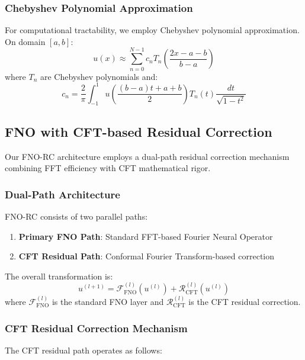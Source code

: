 \documentclass[11pt,twocolumn]{article}
\newcommand{\F}{\mathcal{F}}
\begin{document}
\subsubsection{Chebyshev Polynomial Approximation}

For computational tractability, we employ Chebyshev polynomial approximation. On domain $[a, b]$:
\begin{equation}
u(x) \approx \sum_{n=0}^{N-1} c_n T_n\left(\frac{2x - a - b}{b - a}\right)
\end{equation}
where $T_n$ are Chebyshev polynomials and:
\begin{equation}
c_n = \frac{2}{\pi} \int_{-1}^{1} u\left(\frac{(b-a)t + a + b}{2}\right) T_n(t) \frac{dt}{\sqrt{1-t^2}}
\end{equation}

\subsection{FNO with CFT-based Residual Correction}

Our FNO-RC architecture employs a dual-path residual correction mechanism combining FFT efficiency with CFT mathematical rigor.

\subsubsection{Dual-Path Architecture}

FNO-RC consists of two parallel paths:
\begin{enumerate}
    \item \textbf{Primary FNO Path}: Standard FFT-based Fourier Neural Operator
    \item \textbf{CFT Residual Path}: Conformal Fourier Transform-based correction
\end{enumerate}

The overall transformation is:
\begin{equation}
u^{(l+1)} = \F_{\text{FNO}}^{(l)}(u^{(l)}) + \mathcal{R}_{\text{CFT}}^{(l)}(u^{(l)})
\end{equation}
where $\F_{\text{FNO}}^{(l)}$ is the standard FNO layer and $\mathcal{R}_{\text{CFT}}^{(l)}$ is the CFT residual correction.

\subsubsection{CFT Residual Correction Mechanism}

The CFT residual path operates as follows:
\end{document}
